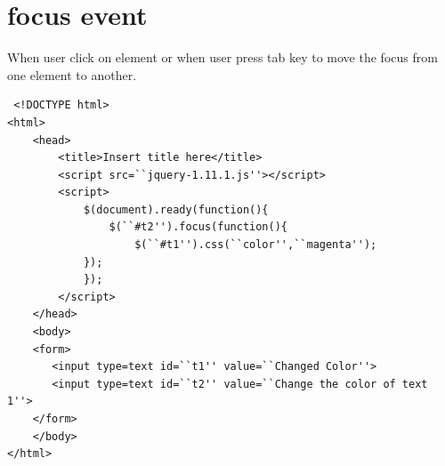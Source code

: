 \documentclass[11pt,a4paper]{article}
\begin{document}
\section*{focus event}
When user click on element or when user press tab key to move the focus from one element to another.
\begin{lstlisting}
 <!DOCTYPE html>
<html>
    <head>
        <title>Insert title here</title>
        <script src=``jquery-1.11.1.js''></script>
        <script>
            $(document).ready(function(){
                $(``#t2'').focus(function(){
                    $(``#t1'').css(``color'',``magenta'');
	        });	
            });
        </script>
    </head>
    <body>
    <form>
       <input type=text id=``t1'' value=``Changed Color''> 
       <input type=text id=``t2'' value=``Change the color of text 1''>
    </form>
    </body>
</html>
\end{lstlisting}
\end{document}
